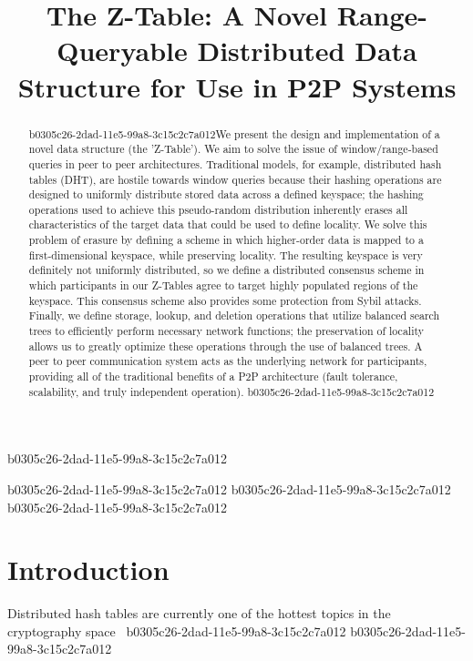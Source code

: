 \documentclass[12pt]{article}
\title{The Z-Table: A Novel Range-Queryable Distributed Data Structure for Use in P2P Systems}
\begin{document}
b0305c26-2dad-11e5-99a8-3c15c2c7a012
\maketitle

\begin{abstract}
b0305c26-2dad-11e5-99a8-3c15c2c7a012We present the design and implementation of a novel data structure (the 'Z-Table'). We aim to solve the issue of window/range-based queries in peer to peer architectures. Traditional models, for example,  distributed hash tables (DHT), are hostile towards window queries because their hashing operations are designed to uniformly distribute stored data across a defined keyspace; the hashing operations used to achieve this pseudo-random distribution inherently erases all characteristics of the target data that could be used to define locality. We solve this problem of erasure by defining a scheme in which higher-order data is mapped to a first-dimensional keyspace, while preserving locality. The resulting keyspace is very definitely not uniformly distributed, so we define a distributed consensus scheme in which participants in our Z-Tables agree to target highly populated regions of the keyspace. This consensus scheme also provides some protection from Sybil attacks. Finally, we define storage, lookup, and deletion operations that utilize balanced search trees to efficiently perform necessary network functions; the preservation of locality allows us to greatly optimize these operations through the use of balanced trees. A peer to peer communication system acts as the underlying network for participants, providing all of the traditional benefits of a P2P architecture (fault tolerance, scalability, and truly independent operation).
b0305c26-2dad-11e5-99a8-3c15c2c7a012\end{abstract}

b0305c26-2dad-11e5-99a8-3c15c2c7a012
b0305c26-2dad-11e5-99a8-3c15c2c7a012\newpage
b0305c26-2dad-11e5-99a8-3c15c2c7a012\section{Introduction}
Distributed hash tables are currently one of the hottest topics in the cryptography space~\cite{Stoica:2001dj,Rowstron:2001ea,Ratnasamy:2001wn}
b0305c26-2dad-11e5-99a8-3c15c2c7a012
\printbibliography
b0305c26-2dad-11e5-99a8-3c15c2c7a012
\end{document}
